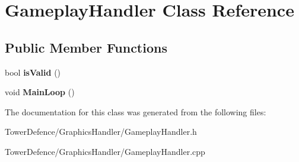 \hypertarget{class_gameplay_handler}{}\section{Gameplay\+Handler Class Reference}
\label{class_gameplay_handler}
\subsection*{Public Member Functions}
\begin{DoxyCompactItemize}
\item 
\mbox{\label{class_gameplay_handler_a8addcdb06c57908784da83512acb21eb}} 
bool {\bfseries is\+Valid} ()
\item 
\mbox{\label{class_gameplay_handler_a1f14353474c1263a14fa0803f4980807}} 
void {\bfseries Main\+Loop} ()
\end{DoxyCompactItemize}


The documentation for this class was generated from the following files\+:\begin{DoxyCompactItemize}
\item 
Tower\+Defence/\+Graphics\+Handler/Gameplay\+Handler.\+h\item 
Tower\+Defence/\+Graphics\+Handler/Gameplay\+Handler.\+cpp\end{DoxyCompactItemize}

